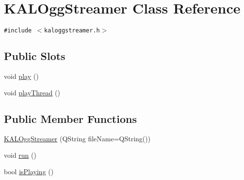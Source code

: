 \hypertarget{class_k_a_l_ogg_streamer}{
\section{KALOggStreamer Class Reference}
\label{class_k_a_l_ogg_streamer}
}
{\tt \#include $<$kaloggstreamer.h$>$}

\subsection*{Public Slots}
\begin{CompactItemize}
\item 
void \hyperlink{class_k_a_l_ogg_streamer_aab73bf0d7037cca7aa8e4371665923a}{play} ()
\item 
void \hyperlink{class_k_a_l_ogg_streamer_22b2a522265b4d2aa13c605d395d6793}{playThread} ()
\end{CompactItemize}
\subsection*{Public Member Functions}
\begin{CompactItemize}
\item 
\hyperlink{class_k_a_l_ogg_streamer_7ed841dd05fc957a59d3b07706bf7ee9}{KALOggStreamer} (QString fileName=QString())
\item 
void \hyperlink{class_k_a_l_ogg_streamer_8ed9af48eac28c9b42b022cd54613fc6}{run} ()
\item 
bool \hyperlink{class_k_a_l_ogg_streamer_aa1b024228536d516184f28cc7374580}{isPlaying} ()
\end{CompactItemize}
